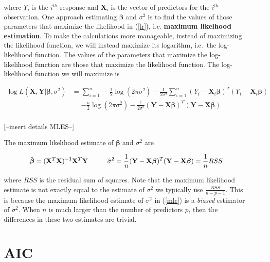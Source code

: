 \documentclass[]{book}
\begin{document}
where \(Y_i\) is the \(i^{th}\) response and \(\mathbf{X}_i\) is the
vector of predictors for the \(i^{th}\) observation. One approach
estimating \(\boldsymbol{\beta}\) and \(\sigma^2\) is to find the values
of those parameters that maximize the likelihood in (\ref{lr}), i.e.
\textbf{maximum likelhood estimation}. To make the calculations more
manageable, instead of maximizing the likelihood function, we will
instead maximize its logarithm, i.e.~the log-likelihood function. The
values of the parameters that maximize the log-likelihood function are
those that maximize the likelihood function. The log-likelihood function
we will maximize is

\begin{equation}
\label{logL}
\begin{aligned}
\log L(\mathbf{X}, \mathbf{Y}|\boldsymbol{\beta}, \sigma^2) &= \sum\limits_{i=1}^n -\frac{1}{2}\log(2\pi\sigma^2) -\frac{1}{2\sigma^2}\sum\limits_{i=1}^n(Y_i - \mathbf{X}_i \boldsymbol{\beta})^T(Y_i - \mathbf{X}_i \boldsymbol{\beta}) \\[10pt]
&= -\frac{n}{2}\log(2\pi\sigma^2) - \frac{1}{2\sigma^2}(\mathbf{Y} - \mathbf{X} \boldsymbol{\beta})^T(\mathbf{Y} - \mathbf{X} \boldsymbol{\beta})\\
\end{aligned}
\end{equation}

{[}--insert details MLES--{]}

The maximum likelihood estimate of \(\boldsymbol{\beta}\) and
\(\sigma^2\) are

\begin{equation}
\label{mle}
\hat{\boldsymbol{\beta}} = (\mathbf{X}^T\mathbf{X})^{-1}\mathbf{X}^T\mathbf{Y} \hspace{10mm} \hat{\sigma}^2 = \frac{1}{n}(\mathbf{Y} - \mathbf{X} \boldsymbol{\beta})^T(\mathbf{Y} - \mathbf{X} \boldsymbol{\beta}) = \frac{1}{n}RSS
\end{equation}

where \(RSS\) is the residual sum of squares. Note that the maximum
likelihood estimate is not exactly equal to the estimate of \(\sigma^2\)
we typically use \(\frac{RSS}{n-p-1}\). This is because the maximum
likelihood estimate of \(\sigma^2\) in (\ref{mle}) is a \emph{biased}
estimator of \(\sigma^2\). When \(n\) is much larger than the number of
predictors \(p\), then the differences in these two estimates are
trivial.

\section{AIC}\label{aic}
\end{document}
